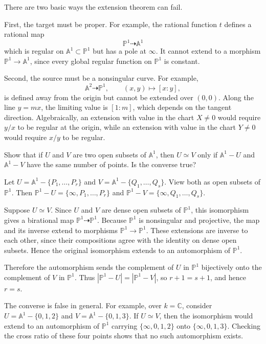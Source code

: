 \documentclass[12pt]{article}
\begin{document}
\begin{remark}
    There are two basic ways the extension theorem can fail.

    First, the target must be proper. For example, the rational function $t$ defines a rational map
    \[
        \mathbb P^1\dashrightarrow \mathbb A^1
    \]
    which is regular on $\mathbb A^1\subset \mathbb P^1$ but has a pole at $\infty$. It cannot extend to a morphism $\mathbb P^1\to \mathbb A^1$, since every global regular function on $\mathbb P^1$ is constant.

    Second, the source must be a nonsingular curve. For example,
    \[
        \mathbb A^2\dashrightarrow \mathbb P^1,
        \qquad
        (x,y)\mapsto [x:y],
    \]
    is defined away from the origin but cannot be extended over $(0,0)$. Along the line $y=mx$, the limiting value is $[1:m]$, which depends on the tangent direction. Algebraically, an extension with value in the chart $X\neq 0$ would require $y/x$ to be regular at the origin, while an extension with value in the chart $Y\neq 0$ would require $x/y$ to be regular.
\end{remark}

\begin{exercise}
    Show that if $U$ and $V$ are two open subsets of $\mathbb A^1$, then $U\simeq V$ only if $\mathbb A^1-U$ and $\mathbb A^1-V$ have the same number of points. Is the converse true?
\end{exercise}

\begin{solution}
    Let
    $U=\mathbb A^1-\{P_1,\dots,P_r\}$ and $V=\mathbb A^1-\{Q_1,\dots,Q_s\}$.
    View both as open subsets of $\mathbb P^1$. Then
    $\mathbb P^1-U=\{\infty,P_1,\dots,P_r\}$ and
    $\mathbb P^1-V=\{\infty,Q_1,\dots,Q_s\}$.

    Suppose $U\simeq V$. Since $U$ and $V$ are dense open subsets of $\mathbb P^1$, this isomorphism gives a birational map $\mathbb P^1\dashrightarrow \mathbb P^1$. Because $\mathbb P^1$ is nonsingular and projective, the map and its inverse extend to morphisms $\mathbb P^1\to \mathbb P^1$. These extensions are inverse to each other, since their compositions agree with the identity on dense open subsets. Hence the original isomorphism extends to an automorphism of $\mathbb P^1$.

    Therefore the automorphism sends the complement of $U$ in $\mathbb P^1$ bijectively onto the complement of $V$ in $\mathbb P^1$. Thus
    $|\mathbb P^1-U|=|\mathbb P^1-V|$, so $r+1=s+1$, and hence $r=s$.

    The converse is false in general. For example, over $k=\mathbb C$, consider
    $U=\mathbb A^1-\{0,1,2\}$ and $V=\mathbb A^1-\{0,1,3\}$.
    If $U\simeq V$, then the isomorphism would extend to an automorphism of $\mathbb P^1$ carrying
    $\{\infty,0,1,2\}$ onto $\{\infty,0,1,3\}$. Checking the cross ratio of these four points shows that no such automorphism exists.
\end{solution}
\end{document}
